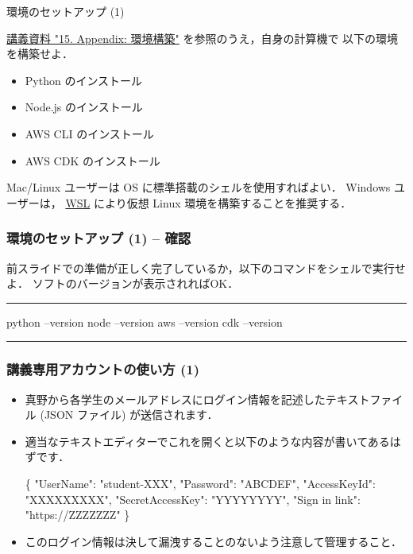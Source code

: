 \documentclass[unicode,11pt]{beamer}
\begin{document}
\begin{frame}{環境のセットアップ (1)}

\href{https://tomomano.github.io/learn-aws-by-coding/#sec:appendix_settingup}{講義資料 "15. Appendix: 環境構築"} を参照のうえ，自身の計算機で
以下の環境を構築せよ．

\begin{itemize}
    \item Python のインストール
    \item Node.js のインストール
    \item AWS CLI のインストール
    \item AWS CDK のインストール
\end{itemize}

Mac/Linux ユーザーは OS に標準搭載のシェルを使用すればよい．
Windows ユーザーは， \href{https://docs.microsoft.com/en-us/windows/wsl/install}{WSL} により仮想 Linux 環境を構築することを推奨する．

\end{frame}

\begin{frame}[fragile]
\frametitle{環境のセットアップ (1) -- 確認}

前スライドでの準備が正しく完了しているか，以下のコマンドをシェルで実行せよ．
ソフトのバージョンが表示されればOK．

\rule{\textwidth}{1pt}

\begin{semiverbatim}
python --version
node --version
aws --version
cdk --version
\end{semiverbatim}

\rule{\textwidth}{1pt}

\end{frame}

\begin{frame}[fragile]
\frametitle{講義専用アカウントの使い方 (1)}

\begin{itemize}
    \item 真野から各学生のメールアドレスにログイン情報を記述したテキストファイル (JSON ファイル) が送信されます．
    \item 適当なテキストエディターでこれを開くと以下のような内容が書いてあるはずです．
    \begin{semiverbatim}
    \{
        "UserName": "student-XXX",
        "Password": "ABCDEF",
        "AccessKeyId": "XXXXXXXXX",
        "SecretAccessKey": "YYYYYYYY",
        "Sign in link": "https://ZZZZZZZ"
    \}
    \end{semiverbatim}
    \item このログイン情報は決して漏洩することのないよう注意して管理すること．
\end{itemize}
    
\end{frame}
\end{document}
